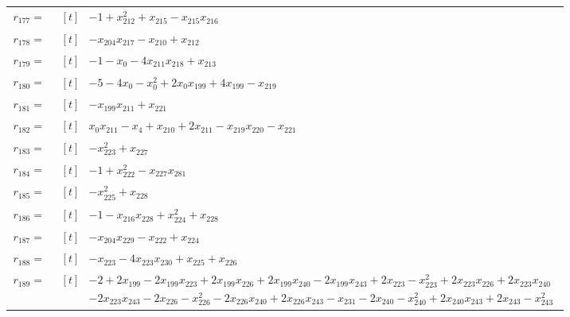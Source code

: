 \begin{longtable}{@{}r p{0.92\linewidth}@{}}
$r_{177}=$ & $\begin{aligned}[t]&-1+x_{212}^{2}+x_{215}-x_{215}x_{216}\end{aligned}$ \\[2pt]
$r_{178}=$ & $\begin{aligned}[t]&-x_{204}x_{217}-x_{210}+x_{212}\end{aligned}$ \\[2pt]
$r_{179}=$ & $\begin{aligned}[t]&-1-x_{0}-4x_{211}x_{218}+x_{213}\end{aligned}$ \\[2pt]
$r_{180}=$ & $\begin{aligned}[t]&-5-4x_{0}-x_{0}^{2}+2x_{0}x_{199}+4x_{199}-x_{219}\end{aligned}$ \\[2pt]
$r_{181}=$ & $\begin{aligned}[t]&-x_{199}x_{211}+x_{221}\end{aligned}$ \\[2pt]
$r_{182}=$ & $\begin{aligned}[t]&x_{0}x_{211}-x_{4}+x_{210}+2x_{211}-x_{219}x_{220}-x_{221}\end{aligned}$ \\[2pt]
$r_{183}=$ & $\begin{aligned}[t]&-x_{223}^{2}+x_{227}\end{aligned}$ \\[2pt]
$r_{184}=$ & $\begin{aligned}[t]&-1+x_{222}^{2}-x_{227}x_{281}\end{aligned}$ \\[2pt]
$r_{185}=$ & $\begin{aligned}[t]&-x_{225}^{2}+x_{228}\end{aligned}$ \\[2pt]
$r_{186}=$ & $\begin{aligned}[t]&-1-x_{216}x_{228}+x_{224}^{2}+x_{228}\end{aligned}$ \\[2pt]
$r_{187}=$ & $\begin{aligned}[t]&-x_{204}x_{229}-x_{222}+x_{224}\end{aligned}$ \\[2pt]
$r_{188}=$ & $\begin{aligned}[t]&-x_{223}-4x_{223}x_{230}+x_{225}+x_{226}\end{aligned}$ \\[2pt]
$r_{189}=$ & $\begin{aligned}[t]&-2+2x_{199}-2x_{199}x_{223}+2x_{199}x_{226}+2x_{199}x_{240}-2x_{199}x_{243}+2x_{223}-x_{223}^{2}+2x_{223}x_{226}+2x_{223}x_{240}\\[-1pt] &-2x_{223}x_{243}-2x_{226}-x_{226}^{2}-2x_{226}x_{240}+2x_{226}x_{243}-x_{231}-2x_{240}-x_{240}^{2}+2x_{240}x_{243}+2x_{243}-x_{243}^{2}\end{aligned}$ \\[2pt]

\end{longtable}
